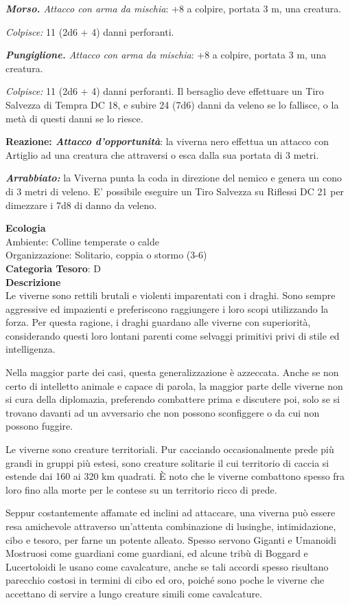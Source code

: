 \begin{multicols}{2}
{\emph{\textbf{Morso.} Attacco con arma da mischia}: +8 a colpire, portata 3 m, una creatura.

\emph{Colpisce:} 11 (2d6 + 4) danni perforanti.

\emph{\textbf{Pungiglione.} Attacco con arma da mischia}: +8 a colpire, portata 3 m, una creatura.

\emph{Colpisce:} 11 (2d6 + 4) danni perforanti. Il bersaglio deve effettuare un Tiro Salvezza di Tempra DC 18, e subire 24 (7d6) danni da veleno se lo fallisce, o la metà di questi danni se lo riesce.

\textbf{Reazione: \emph{Attacco d'opportunità}}: la viverna nero effettua un attacco con Artiglio ad una creatura che attraversi o esca dalla sua portata di 3 metri.

\emph{\textbf{Arrabbiato:}} la Viverna punta la coda in direzione del nemico e genera un cono di 3 metri di veleno. E' possibile eseguire un Tiro Salvezza su Riflessi DC 21 per dimezzare i 7d8 di danno da veleno.

\textbf{Ecologia}\\
Ambiente: Colline temperate o calde\\
Organizzazione: Solitario, coppia o stormo (3-6)\\
\textbf{Categoria Tesoro}: D\\
\textbf{Descrizione}\\
Le viverne sono rettili brutali e violenti imparentati con i draghi. Sono sempre aggressive ed impazienti e preferiscono raggiungere i loro scopi utilizzando la forza. Per questa ragione, i draghi guardano alle viverne con superiorità, considerando questi loro lontani parenti come selvaggi primitivi privi di stile ed intelligenza.

Nella maggior parte dei casi, questa generalizzazione è azzeccata. Anche se non certo di intelletto animale e capace di parola, la maggior parte delle viverne non si cura della diplomazia, preferendo combattere prima e discutere poi, solo se si trovano davanti ad un avversario che non possono sconfiggere o da cui non possono fuggire.

Le viverne sono creature territoriali. Pur cacciando occasionalmente prede più grandi in gruppi più estesi, sono creature solitarie il cui territorio di caccia si estende dai 160 ai 320 km quadrati. È noto che le viverne combattono spesso fra loro fino alla morte per le contese su un territorio ricco di prede.

Seppur costantemente affamate ed inclini ad attaccare, una viverna può essere resa amichevole attraverso un'attenta combinazione di lusinghe, intimidazione, cibo e tesoro, per farne un potente alleato. Spesso servono Giganti e Umanoidi Mostruosi come guardiani come guardiani, ed alcune tribù di Boggard e Lucertoloidi le usano come cavalcature, anche se tali accordi spesso risultano parecchio costosi in termini di cibo ed oro, poiché sono poche le viverne che accettano di servire a lungo creature simili come cavalcature.

}
\end{multicols}
